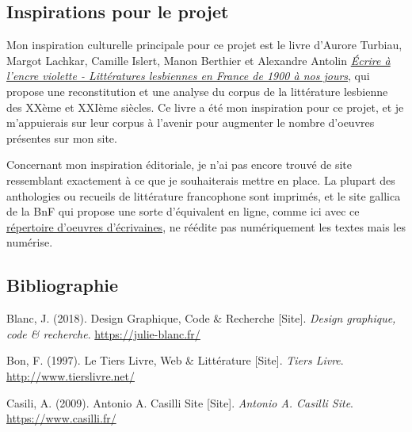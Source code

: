 \documentclass[12pt,french,letterpaper]{article}
\begin{document}
{\hypertarget{inspirations-pour-le-projet}{%
\subsection{\texorpdfstring{\textbf{Inspirations pour le
projet}}{Inspirations pour le projet}}\label{inspirations-pour-le-projet}}

Mon inspiration culturelle principale pour ce projet est le livre
d'Aurore Turbiau, Margot Lachkar, Camille Islert, Manon Berthier et
Alexandre Antolin
\href{http://www.lecavalierbleu.com/livre/ecrire-a-lencre-violette/}{\emph{Écrire
à l'encre violette - Littératures lesbiennes en France de 1900 à nos
jours}}, qui propose une reconstitution et une analyse du corpus de la
littérature lesbienne des XXème et XXIème siècles. Ce livre a été mon
inspiration pour ce projet, et je m'appuierais sur leur corpus à
l'avenir pour augmenter le nombre d'oeuvres présentes sur mon site.

Concernant mon inspiration éditoriale, je n'ai pas encore trouvé de site
ressemblant exactement à ce que je souhaiterais mettre en place. La
plupart des anthologies ou recueils de littérature francophone sont
imprimés, et le site gallica de la BnF qui propose une sorte
d'équivalent en ligne, comme ici avec ce
\href{https://gallica.bnf.fr/html/und/litteratures/femmes-de-lettres?mode=desktop}{répertoire
d'oeuvres d'écrivaines}, ne réédite pas numériquement les textes mais
les numérise.

\newpage

\hypertarget{bibliographie}{%
\subsection*{Bibliographie}\label{bibliographie}}

\hypertarget{refs}{}
\begin{CSLReferences}{1}{0}
\leavevmode{}%
Blanc, J. (2018). Design Graphique, Code \& Recherche {[}Site{]}.
\emph{Design graphique, code \& recherche}.
\url{https://julie-blanc.fr/}

\leavevmode{}%
Bon, F. (1997). Le {Tiers} Livre, Web \& Littérature {[}Site{]}.
\emph{Tiers Livre}. \url{http://www.tierslivre.net/}

\leavevmode{}%
Casili, A. (2009). Antonio {A}. {Casilli Site} {[}Site{]}. \emph{Antonio
A. Casilli Site}. \url{https://www.casilli.fr/}


\end{CSLReferences}}
\end{document}
